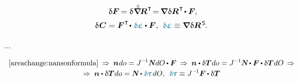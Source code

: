 \begin{otherlanguage}{russian}
\begin{equation}
\begin{array}{c}
\:\,
\variation{\bm{F}} \hspace{-0.2ex} = \variation{\hspace{.1ex} \boldnablacircled \hspace{-0.16ex} \bm{R}^{\hspace{.12ex}\T}} \hspace{-0.4ex}
= \hspace{-0.2ex} \boldnabla \hspace{.1ex} \variation{\bm{R}}^{\hspace{.12ex}\T} \hspace{-0.25ex} \dotp \bm{F}
\hspace{-0.1ex} ,
\\[.5em]
%
\variation{\hspace{.12ex}\bm{C}} = \bm{F}^{\hspace{.1ex}\T} \hspace{-0.32ex} \dotp \hspace{.1ex} \varbivalent{\mathboldepsilon} \dotp \bm{F} ,
\:\,
\varbivalent{\mathboldepsilon} \equiv \boldnabla \hspace{.1ex} \variation{\bm{R}}^{\hspace{.25ex}\mathsf{S}}
\hspace{-0.15ex} .
\end{array}
\end{equation}

...

\begin{equation*}\begin{array}{c}
\eqref{areachange:nansonformula}
\:\Rightarrow\:
%
\bm{n} \hspace{.1ex} do = J^{\hspace{.12ex}\expminusone} \mathboldN \hspace{.1ex} dO \hspace{-0.1ex} \dotp \bm{F}
\:\Rightarrow\:
%
\bm{n} \dotp \variation{\firstpiolakirchhoffstress} \hspace{.1ex} do
= J^{\hspace{.12ex}\expminusone} \mathboldN \hspace{-0.1ex} \dotp \bm{F} \hspace{-0.1ex} \dotp \variation{\firstpiolakirchhoffstress} \hspace{.1ex} dO
\,\Rightarrow
\\[.2em]
%
\Rightarrow\:
\bm{n} \dotp \variation{\firstpiolakirchhoffstress} \hspace{.1ex} do
= \mathboldN \dotp \varbivalent{\hspace{-0.2ex}\cauchystress} \hspace{.25ex} dO ,
\:\:
\varbivalent{\hspace{-0.2ex}\cauchystress} \equiv J^{\hspace{.12ex}\expminusone} \bm{F} \hspace{-0.1ex} \dotp \variation{\firstpiolakirchhoffstress}
\end{array}\end{equation*}


\end{otherlanguage}
